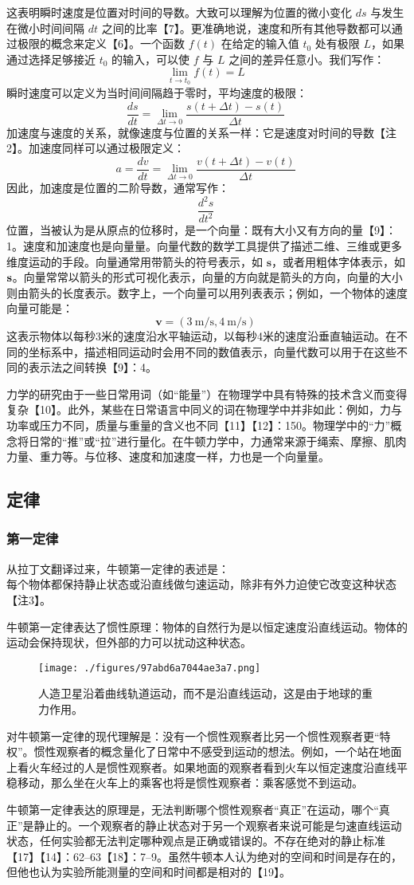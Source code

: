 这表明瞬时速度是位置对时间的导数。大致可以理解为位置的微小变化 \( ds \) 与发生在微小时间间隔 \( dt \) 之间的比率【7】。更准确地说，速度和所有其他导数都可以通过极限的概念来定义【6】。一个函数 \( f(t) \) 在给定的输入值 \( t_0 \) 处有极限 \( L \)，如果通过选择足够接近 \( t_0 \) 的输入，可以使 \( f \) 与 \( L \) 之间的差异任意小。我们写作：
\[
\lim _{t\to t_{0}}f(t)=L~
\]
瞬时速度可以定义为当时间间隔趋于零时，平均速度的极限：
\[
\frac{ds}{dt}=\lim _{\Delta t\to 0}\frac{s(t+\Delta t)-s(t)}{\Delta t}~
\]
加速度与速度的关系，就像速度与位置的关系一样：它是速度对时间的导数【注2】。加速度同样可以通过极限定义：
\[
a=\frac{dv}{dt}=\lim _{\Delta t\to 0}\frac{v(t+\Delta t)-v(t)}{\Delta t}~
\]
因此，加速度是位置的二阶导数，通常写作：
\[
\frac{d^{2}s}{dt^{2}}~
\]
位置，当被认为是从原点的位移时，是一个向量：既有大小又有方向的量【9】：1。速度和加速度也是向量量。向量代数的数学工具提供了描述二维、三维或更多维度运动的手段。向量通常用带箭头的符号表示，如 \( \mathbf{s} \)，或者用粗体字体表示，如 \( {\bf {s}} \)。向量常常以箭头的形式可视化表示，向量的方向就是箭头的方向，向量的大小则由箭头的长度表示。数字上，一个向量可以用列表表示；例如，一个物体的速度向量可能是：
\[
\mathbf{v} = (3 \ \mathrm{m/s}, 4 \ \mathrm{m/s})~
\]
这表示物体以每秒3米的速度沿水平轴运动，以每秒4米的速度沿垂直轴运动。在不同的坐标系中，描述相同运动时会用不同的数值表示，向量代数可以用于在这些不同的表示法之间转换【9】：4。

力学的研究由于一些日常用词（如“能量”）在物理学中具有特殊的技术含义而变得复杂【10】。此外，某些在日常语言中同义的词在物理学中并非如此：例如，力与功率或压力不同，质量与重量的含义也不同【11】【12】：150。物理学中的“力”概念将日常的“推”或“拉”进行量化。在牛顿力学中，力通常来源于绳索、摩擦、肌肉力量、重力等。与位移、速度和加速度一样，力也是一个向量量。
\subsection{定律}
\subsubsection{第一定律}
从拉丁文翻译过来，牛顿第一定律的表述是：\\
每个物体都保持静止状态或沿直线做匀速运动，除非有外力迫使它改变这种状态【注3】。

牛顿第一定律表达了惯性原理：物体的自然行为是以恒定速度沿直线运动。物体的运动会保持现状，但外部的力可以扰动这种状态。
\begin{figure}[ht]
\centering
\texttt{[image: ./figures/97abd6a7044ae3a7.png]}
\caption{人造卫星沿着曲线轨道运动，而不是沿直线运动，这是由于地球的重力作用。} \label{fig_NEW01_1}
\end{figure}
对牛顿第一定律的现代理解是：没有一个惯性观察者比另一个惯性观察者更“特权”。惯性观察者的概念量化了日常中不感受到运动的想法。例如，一个站在地面上看火车经过的人是惯性观察者。如果地面的观察者看到火车以恒定速度沿直线平稳移动，那么坐在火车上的乘客也将是惯性观察者：乘客感觉不到运动。

牛顿第一定律表达的原理是，无法判断哪个惯性观察者“真正”在运动，哪个“真正”是静止的。一个观察者的静止状态对于另一个观察者来说可能是匀速直线运动状态，任何实验都无法判定哪种观点是正确或错误的。不存在绝对的静止标准【17】【14】：62–63【18】：7–9。虽然牛顿本人认为绝对的空间和时间是存在的，但他也认为实验所能测量的空间和时间都是相对的【19】。